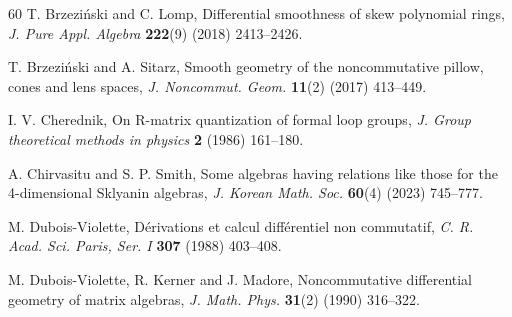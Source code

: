 \documentclass{amsart}
\theoremstyle{definition}
\theoremstyle{remark}
\numberwithin{equation}{section}
\begin{document}
\begin{thebibliography}{60}
 T. Brzezi{\'n}ski and C. Lomp, Differential smoothness of skew polynomial rings, {\em J. Pure Appl. Algebra} {\bf 222}(9) (2018) 2413--2426.

T. Brzezi{\'n}ski and A. Sitarz, Smooth geometry of the noncommutative pillow, cones and lens spaces, {\em J. Noncommut. Geom.} {\bf 11}(2) (2017) 413--449.




 I. V. Cherednik, On {R}-matrix quantization of formal loop groups, {\em J. Group theoretical methods in physics} {\bf 2} (1986) 161--180.

 A. Chirvasitu and S. P.  Smith, Some algebras having relations like those for the 4-dimensional {S}klyanin algebras, {\em J. Korean Math. Soc.} {\bf 60}(4) (2023) 745--777.



 M. Dubois-Violette, D\'erivations et calcul diff\'erentiel non commutatif, {\em C. R. Acad. Sci. Paris, Ser. I} {\bf 307} (1988) 403--408.

 M. Dubois-Violette, R. Kerner and J. Madore, Noncommutative differential geometry of matrix algebras, {\em J. Math. Phys.} {\bf 31}(2) (1990) 316--322.



\end{thebibliography}
\end{document}
